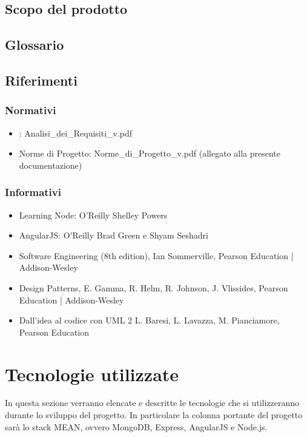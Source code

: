 \subsection{Scopo del prodotto}
\Prodotto{}

\subsection{Glossario}
\Glossario{}

\subsection{Riferimenti}

\subsubsection{Normativi}
\begin{itemize}
\item {}: Analisi\_{}dei\_{}Requisiti\_{}v\versioneNormeDiProgetto{}.pdf
\item Norme di Progetto: Norme\_{}di\_{}Progetto\_{}v\versioneNormeDiProgetto{}.pdf  (allegato alla presente documentazione)\\
\end{itemize}

\subsubsection{Informativi}
\begin{itemize}
\item Learning Node: O'Reilly Shelley Powers
\item AngularJS: O'Reilly Brad Green e Shyam Seshadri
\item Software Engineering (8th edition), Ian Sommerville, Pearson Education | Addison-Wesley
\item Design Patterns, E. Gamma, R. Helm, R. Johnson, J. Vlissides, Pearson Education | Addison-Wesley
\item Dall'idea al codice con UML 2       L. Baresi, L. Lavazza, M. Pianciamore, Pearson Education
\end{itemize}

\newpage
\section{Tecnologie utilizzate}
In questa sezione verranno elencate e descritte le tecnologie che si utilizzeranno durante lo sviluppo del progetto. In particolare la colonna portante del progetto sarà lo stack MEAN, ovvero MongoDB, Express, AngularJS e Node.js.

